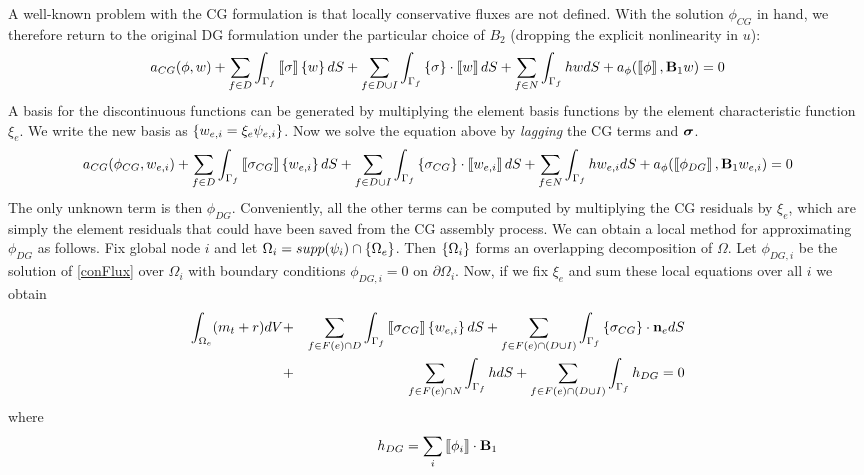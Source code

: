 \documentclass[10pt,dvips,twoside,reqno]{amsart}
\begin{document}
A well-known problem with the CG formulation is that locally
conservative fluxes are not defined.  With the solution $\phi_{CG}$ in
hand, we therefore return to the original DG formulation under the
particular choice of $B_2$ (dropping the explicit nonlinearity in
$u$):
\begin{equation}
a_{CG}(\phi,w) + \sum_{f \in D } \int_{\Gamma_f} \dbl \sigma \dbr \cbl w \cbr dS + \sum_{f \in D \cup I} \int_{\Gamma_f} \cbl \sigma \cbr \cdot \dbl w \dbr dS + \sum_{f \in N} \int_{\Gamma_f} hw dS+ a_{\phi}(\dbl \phi \dbr, \vec B_1 w) = 0 
\end{equation}
A basis for the discontinuous functions can be generated by
multiplying the element basis functions by the element characteristic function $\xi_e$. We write the new basis as $\left\{
w_{e,i} = \xi_{e} \psi_{e,i} \right\} $. Now we solve the equation
above by {\em lagging} the CG terms and $\mbox{{\boldmath ${\sigma}$}} $.
\begin{equation}
a_{CG}(\phi_{CG},w_{e,i}) + \sum_{f \in D } \int_{\Gamma_f} \dbl \sigma_{CG} \dbr \cbl w_{e,i} \cbr dS + \sum_{f \in D \cup I} \int_{\Gamma_f} \cbl \sigma_{CG} \cbr \cdot \dbl w_{e,i} \dbr dS + \sum_{f \in N} \int_{\Gamma_f} hw_{e,i} dS+ a_{\phi}(\dbl \phi_{DG} \dbr, \vec B_1 w_{e,i}) = 0 \label{conFlux}
\end{equation}
The only unknown term is then $\phi_{DG}$. Conveniently, all the other
terms can be computed by multiplying the CG residuals by $\xi_e$,
which are simply the element residuals that could have been saved from
the CG assembly process.  We can obtain a local method for
approximating $\phi_{DG}$ as follows. Fix global node $i$ and let
$\Omega_i = supp(\psi_i) \cap \left\{ \Omega_e \right\}$. Then $\left\{ \Omega_i
\right\}$ forms an overlapping decomposition of $\Omega$. Let
$\phi_{DG,i}$ be the solution of \ref{conFlux} over $\Omega_i$ with
boundary conditions $\phi_{DG,i} = 0$ on $\partial \Omega_i$. Now, if
we fix $\xi_e$ and sum these local equations over all $i$ we obtain
\begin{eqnarray}
\int_{\Omega_e} (m_t + r) dV &+& \sum_{f \in F(e) \cap D} \int_{\Gamma_f} \dbl \sigma_{CG} \dbr \cbl w_{e,i} \cbr dS + \sum_{f \in F(e) \cap (D \cup I)} \int_{\Gamma_f} \cbl \sigma_{CG} \cbr \cdot \vec n_e dS \\&+& \sum_{f \in F(e) \cap N} \int_{\Gamma_f} h dS+ \sum_{f \in F(e) \cap (D \cup I)} \int_{\Gamma_f} h_{DG} = 0
\end{eqnarray}
where 
\begin{equation}
h_{DG} = \sum_{i} \dbl \phi_{i} \dbr \cdot \vec B_1
\end{equation}
\end{document}
